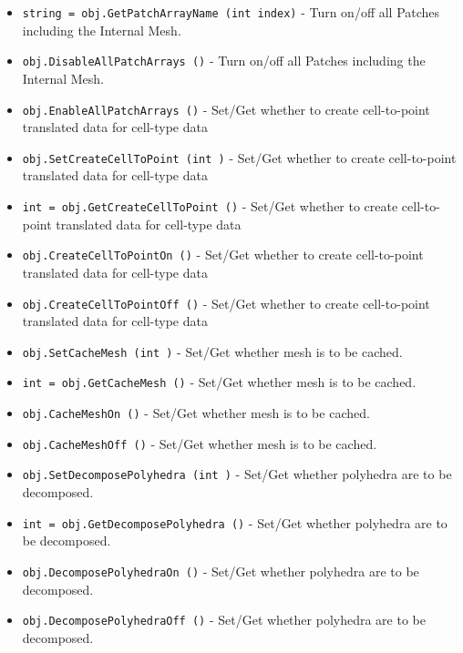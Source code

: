 \begin{itemize}
\item  \verb|string = obj.GetPatchArrayName (int index)| -  Turn on/off all Patches including the Internal Mesh.

\item  \verb|obj.DisableAllPatchArrays ()| -  Turn on/off all Patches including the Internal Mesh.

\item  \verb|obj.EnableAllPatchArrays ()| -  Set/Get whether to create cell-to-point translated data for cell-type data

\item  \verb|obj.SetCreateCellToPoint (int )| -  Set/Get whether to create cell-to-point translated data for cell-type data

\item  \verb|int = obj.GetCreateCellToPoint ()| -  Set/Get whether to create cell-to-point translated data for cell-type data

\item  \verb|obj.CreateCellToPointOn ()| -  Set/Get whether to create cell-to-point translated data for cell-type data

\item  \verb|obj.CreateCellToPointOff ()| -  Set/Get whether to create cell-to-point translated data for cell-type data

\item  \verb|obj.SetCacheMesh (int )| -  Set/Get whether mesh is to be cached.

\item  \verb|int = obj.GetCacheMesh ()| -  Set/Get whether mesh is to be cached.

\item  \verb|obj.CacheMeshOn ()| -  Set/Get whether mesh is to be cached.

\item  \verb|obj.CacheMeshOff ()| -  Set/Get whether mesh is to be cached.

\item  \verb|obj.SetDecomposePolyhedra (int )| -  Set/Get whether polyhedra are to be decomposed.

\item  \verb|int = obj.GetDecomposePolyhedra ()| -  Set/Get whether polyhedra are to be decomposed.

\item  \verb|obj.DecomposePolyhedraOn ()| -  Set/Get whether polyhedra are to be decomposed.

\item  \verb|obj.DecomposePolyhedraOff ()| -  Set/Get whether polyhedra are to be decomposed.


\end{itemize}
